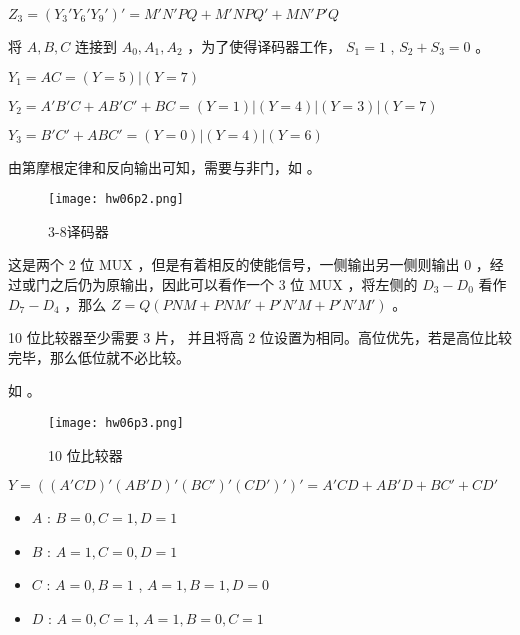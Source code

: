 \documentclass[lang=cn,11pt,a4paper,cite=authoryear,twocolumn]{elegantpaper}
\begin{document}
\(Z_3 = (Y_3' Y_6' Y_9')' = M'N'PQ + M'NPQ' + MN'P'Q\)


将 \(A, B, C\) 连接到 \(A_0, A_1, A_2\) ，为了使得译码器工作， \(S_1 = 1\) , \(S_2 + S_3 = 0\) 。

\(Y_1 = AC = (Y=5) | (Y=7)\)

\(Y_2 = A'B'C + AB'C' + BC = (Y=1) | (Y=4) | (Y=3) | (Y=7)\)

\(Y_3 = B'C' + ABC' = (Y=0) | (Y=4) | (Y=6)\) 

由第摩根定律和反向输出可知，需要与非门，如  。

\begin{figure*}[!htb]
    \centering
    \texttt{[image: hw06p2.png]}
    \caption{3-8译码器}
    \label{02}
\end{figure*}


这是两个 2 位 MUX ，但是有着相反的使能信号，一侧输出另一侧则输出 0 ，经过或门之后仍为原输出，因此可以看作一个 3 位 MUX ，将左侧的 \(D_3 - D_0\) 看作 \(D_7-D_4\) ，那么 \(Z = Q(PNM + PNM' + P'N'M + P'N'M')\) 。



10 位比较器至少需要 3 片， 并且将高 2 位设置为相同。高位优先，若是高位比较完毕，那么低位就不必比较。

如  。

\begin{figure*}[!htb]
    \centering
    \texttt{[image: hw06p3.png]}
    \caption{10 位比较器}
    \label{03}
\end{figure*}




\(Y = ((A'CD)' (AB'D)' (BC')' (CD')')' = A'CD + AB'D + BC' + CD'\)

\begin{itemize}
    \item \(A\) : \(B = 0, C = 1, D = 1\)
    \item \(B\) : \(A = 1, C = 0, D = 1\)
    \item \(C\) : \(A = 0, B = 1\) , \(A = 1, B = 1, D = 0\) 
    \item \(D\) : \(A = 0, C = 1\), \(A = 1, B = 0, C = 1\)
\end{itemize}

\end{document}
